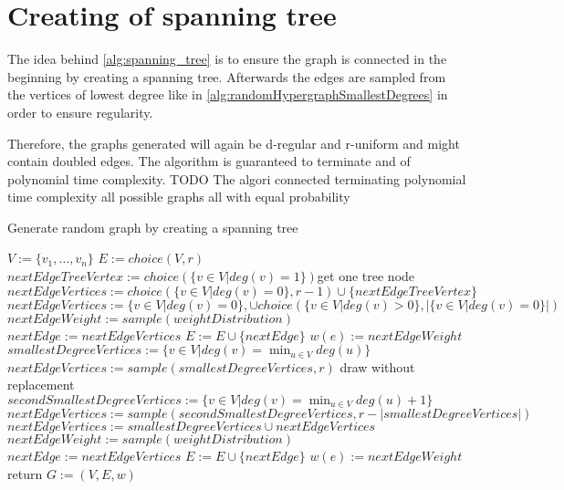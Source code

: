 	
	
\section{Creating of spanning tree}
The idea behind \cref{alg:spanning_tree} is to ensure the graph is connected in the beginning by creating a spanning tree. Afterwards the edges are sampled from the vertices of lowest degree like in \cref{alg:randomHypergraphSmallestDegrees} in order to ensure regularity.

Therefore, the graphs generated will again be d-regular and r-uniform and might contain doubled edges. The algorithm is guaranteed to terminate and of polynomial time complexity.
TODO
The algori
connected 
terminating 
polynomial time complexity
all possible graphs 
all with equal probability

	\begin{algorithm}[htpb]
		\caption{Generate random graph by creating a spanning tree\label{alg:spanning_tree}} 
		\begin{algorithmic}
			\State $V := \{v_1, \ldots, v_n\}$
			\State $E := choice(V,r)$
			\State $nextEdgeTreeVertex := choice(\{v\in V| deg(v) = 1 \})$\Comment get one tree node
			\State $nextEdgeVertices := choice(\{v\in V| deg(v) =0\}, r-1) \cup \{nextEdgeTreeVertex\}$
			\Else
			\State  $nextEdgeVertices :=  \{v\in V| deg(v) =0\},  \cup choice(\{v\in V| deg(v) >0\},| \{v\in V| deg(v) =0\}| ) $
			\EndIf
			\State $nextEdgeWeight := sample(weightDistribution)$ 
			\State $nextEdge := nextEdgeVertices$
			\State $E := E \cup \{nextEdge\}$
			\State $w(e):= nextEdgeWeight$
			\EndWhile
			\State $ smallestDegreeVertices := \{v\in V| deg(v) = \min_{u\in V} deg(u) \}$
			\State $nextEdgeVertices := sample(smallestDegreeVertices, r) $ \Comment draw without replacement
			\Else
			\State $secondSmallestDegreeVertices := \{v\in V| deg(v) = \min_{u\in V} deg(u) +1 \}$
			\State $nextEdgeVertices :=  sample(secondSmallestDegreeVertices, r - | smallestDegreeVertices|)$
			\State $nextEdgeVertices := smallestDegreeVertices \cup nextEdgeVertices  $
			\EndIf
			\State $nextEdgeWeight := sample(weightDistribution)$ 
			\State $nextEdge := nextEdgeVertices$
			\State $E := E \cup \{nextEdge\}$
			\State $w(e):= nextEdgeWeight$
			\EndWhile
			\State return $G:=(V,E, w)$	
			\EndFunction 
		\end{algorithmic}
	\end{algorithm}	
	
